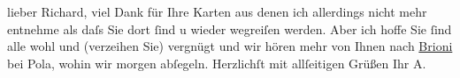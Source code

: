 \begin{ledgroupsized}[t]{13cm}
           \pstart
           {\pb}lieber Richard, viel Dank für Ihre Karten aus denen ich allerdings
               nicht mehr entnehme als daſs Sie dort ſind u wieder wegreiſen werden. Aber ich hoffe
               Sie ſind alle wohl und (verzeihen Sie) vergnügt und wir hören mehr von Ihnen nach \uline{Brioni} bei Pola, wohin wir morgen abſegeln.
               Herzlichſt mit allſeitigen Grüßen \pend
           \pstart Ihr \spacefill\mbox{A.}\pend{}          \endnumbering{}\end{ledgroupsized}  \newcommand{\dateiname}{L02079}\newcommand{\titel}{Arthur Schnitzler an Richard Beer-Hofmann, 19. 7. 1912}\newcommand{\editorInnen}{Martin Anton Müller und Gerd-Hermann Susen}
      